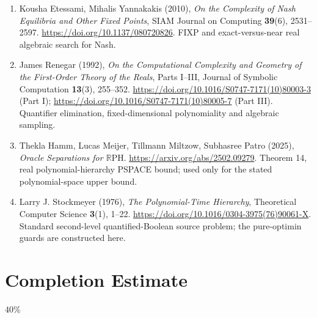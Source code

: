 \documentclass[11pt,a4paper]{article}
\begin{document}
\begin{enumerate}[leftmargin=2.75em,itemsep=4pt]
\item[S7] Kousha Etessami, Mihalis Yannakakis (2010), \emph{On the Complexity of Nash Equilibria and Other Fixed Points}, SIAM Journal on Computing \textbf{39}(6), 2531--2597. \url{https://doi.org/10.1137/080720826}. FIXP and exact-versus-near real algebraic search for Nash.
\item[S8] James Renegar (1992), \emph{On the Computational Complexity and Geometry of the First-Order Theory of the Reals}, Parts I--III, Journal of Symbolic Computation \textbf{13}(3), 255--352. \url{https://doi.org/10.1016/S0747-7171(10)80003-3} (Part I); \url{https://doi.org/10.1016/S0747-7171(10)80005-7} (Part III). Quantifier elimination, fixed-dimensional polynomiality and algebraic sampling.
\item[S9] Thekla Hamm, Lucas Meijer, Tillmann Miltzow, Subhasree Patro (2025), \emph{Oracle Separations for $\mathbb R\mathrm{PH}$}. \url{https://arxiv.org/abs/2502.09279}. Theorem 14, real polynomial-hierarchy PSPACE bound; used only for the stated polynomial-space upper bound.
\item[S10] Larry J. Stockmeyer (1976), \emph{The Polynomial-Time Hierarchy}, Theoretical Computer Science \textbf{3}(1), 1--22. \url{https://doi.org/10.1016/0304-3975(76)90061-X}. Standard second-level quantified-Boolean source problem; the pure-optimin guards are constructed here.
\end{enumerate}
\section{Completion Estimate}
40\%
\end{document}
